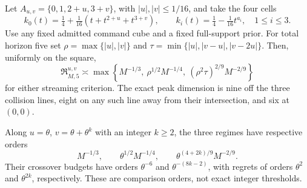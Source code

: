\begin{corollary}\label{cor:two-parameter}
Let $A_{u,v}=\{0,1,2+u,3+v\}$, with
$|u|,|v|\le1/16$, and take the four cells
\[
 k_0(t)=\tfrac14+\tfrac1{16}(t+t^{2+u}+t^{3+v}),\qquad
 k_i(t)=\tfrac14-\tfrac1{16}t^{a_i},\quad 1\le i\le3.
\]
Use any fixed admitted command cube and a fixed full-support prior.
For total horizon five set
$\rho=\max\{|u|,|v|\}$ and
$\tau=\min\{|u|,|v-u|,|v-2u|\}$. Then, uniformly on the square,
\begin{equation}\label{eq:two-parameter-law}
 \mathfrak R_{M,5}^{u,v}\asymp
 \max\left\{M^{-1/3},\ \rho^{1/2}M^{-1/4},\
           (\rho^2\tau)^{2/9}M^{-2/9}\right\}
\end{equation}
for either streaming criterion. The exact peak dimension is nine off the
three collision lines, eight on any such line away from their intersection,
and six at $(0,0)$.

Along $u=\theta$, $v=\theta+\theta^k$ with an integer $k\ge2$,
the three regimes have respective orders
\[
 M^{-1/3},\qquad \theta^{1/2}M^{-1/4},\qquad
       \theta^{(4+2k)/9}M^{-2/9}.
\]
Their crossover budgets have orders $\theta^{-6}$ and
$\theta^{-(8k-2)}$, with regrets of orders $\theta^2$ and
$\theta^{2k}$, respectively. These are comparison orders, not exact
integer thresholds.
\end{corollary}
